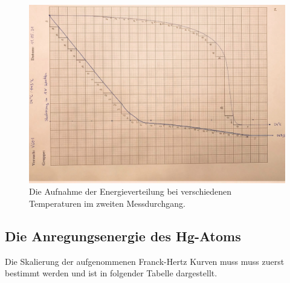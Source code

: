 \begin{figure}[H]
  \centering
  \includegraphics[scale=0.25]{content/kurv2.jpeg}
  \caption{Die Aufnahme der Energieverteilung bei verschiedenen Temperaturen im zweiten Messdurchgang.}
  \label{fig:franckhertz2}
\end{figure}

\subsection{Die Anregungsenergie des Hg-Atoms}
\label{sec:anrhgat}
Die Skalierung der aufgenommenen Franck-Hertz Kurven muss muss zuerst bestimmt werden
und ist in folgender Tabelle dargestellt.

